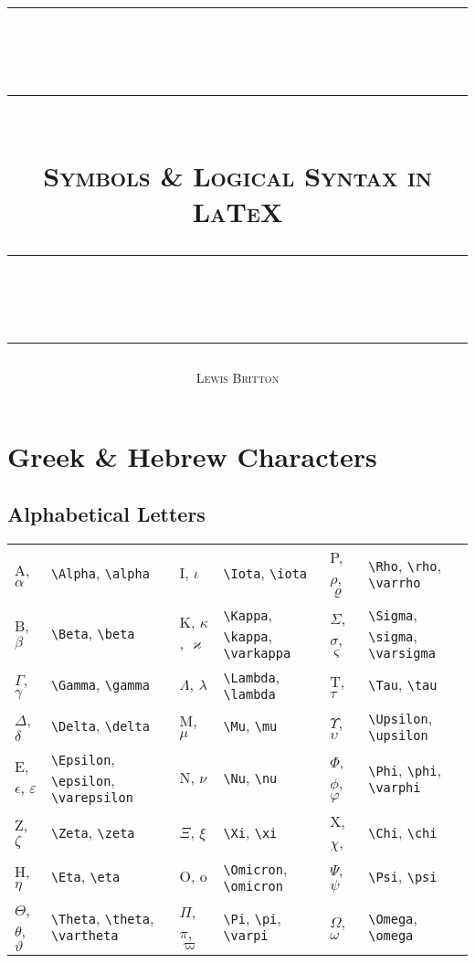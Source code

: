 \documentclass[10pt, english]{article}
\newcommand{\HRule}[1]{\rule{\linewidth}{#1}}
\begin{document}

	\title{
		\HRule{0.5pt}\\ [-0.9cm]
		\HRule{0.5pt}\\ [0.3cm]
		\textsc{Symbols \& Logical Syntax in {\LaTeX}}
		\HRule{0.5pt}\\ [-0.9cm]
		\HRule{0.5pt}
	}
	\author{\textsc{Lewis Britton}}
	\date{}
	\maketitle

\section{Greek \& Hebrew Characters}

	\subsection{Alphabetical Letters}

	\begin{center}
		\scriptsize
	\begin{tabular}{ll|ll|ll}
		A, $\alpha$ & \verb|\Alpha|, \verb|\alpha| & I, $\iota$ & \verb|\Iota|, \verb|\iota| & P, $\rho$, $\varrho$ & \verb|\Rho|, \verb|\rho|, \verb|\varrho| \\
		B, $\beta$ & \verb|\Beta|, \verb|\beta| & K, $\kappa$, $\varkappa$ & \verb|\Kappa|, \verb|\kappa|, \verb|\varkappa| & $\Sigma$, $\sigma$, $\varsigma$ & \verb|\Sigma|, \verb|\sigma|, \verb|\varsigma| \\
		$\Gamma$, $\gamma$ & \verb|\Gamma|, \verb|\gamma| & $\Lambda$, $\lambda$ & \verb|\Lambda|, \verb|\lambda| & T, $\tau$ & \verb|\Tau|, \verb|\tau| \\
		$\Delta$, $\delta$ & \verb|\Delta|, \verb|\delta| & M, $\mu$ & \verb|\Mu|, \verb|\mu| & $\Upsilon$, $\upsilon$ & \verb|\Upsilon|, \verb|\upsilon| \\
		E, $\epsilon$, $\varepsilon$ & \verb|\Epsilon|, \verb|\epsilon|, \verb|\varepsilon| & N, $\nu$ & \verb|\Nu|, \verb|\nu| & $\Phi$, $\phi$, $\varphi$ & \verb|\Phi|, \verb|\phi|, \verb|\varphi| \\
		Z, $\zeta$ & \verb|\Zeta|, \verb|\zeta| & $\Xi$, $\xi$ & \verb|\Xi|, \verb|\xi| & X, $\chi$, & \verb|\Chi|, \verb|\chi| \\
		H, $\eta$ & \verb|\Eta|, \verb|\eta| & O, o & \verb|\Omicron|, \verb|\omicron| & $\Psi$, $\psi$ & \verb|\Psi|, \verb|\psi| \\
		$\Theta$, $\theta$, $\vartheta$ & \verb|\Theta|, \verb|\theta|, \verb|\vartheta| & $\Pi$, $\pi$, $\varpi$ & \verb|\Pi|, \verb|\pi|, \verb|\varpi| & $\Omega$, $\omega$ & \verb|\Omega|, \verb|\omega| \\
	\end{tabular}
	\end{center}
\end{document}
